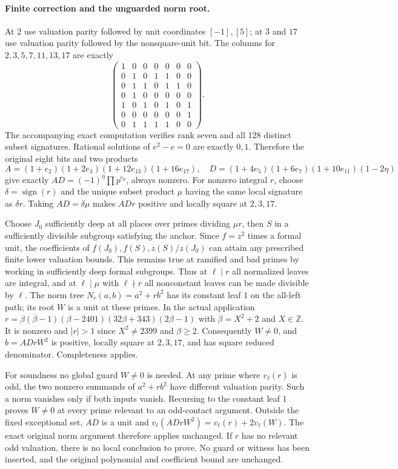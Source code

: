 \paragraph{Finite correction and the unguarded norm root.}
At $2$ use valuation parity followed by unit coordinates $[-1],[5]$;
at $3$ and $17$ use valuation parity followed by the nonsquare-unit bit.
The columns for $2,3,5,7,11,13,17$ are exactly
\[
\begin{pmatrix}
1&0&0&0&0&0&0\\0&1&0&1&1&0&0\\0&1&1&0&1&1&0\\
0&1&0&0&0&0&0\\1&0&1&0&1&0&1\\0&0&0&0&0&0&1\\
0&1&1&1&1&0&0
\end{pmatrix}.
\]
The accompanying exact computation verifies rank seven and all 128
distinct subset signatures. Rational solutions of $e^2-e=0$ are
exactly $0,1$. Therefore the original eight bits and two products
\[
 A=(1+e_2)(1+2e_3)(1+12e_{13})(1+16e_{17}),\quad
 D=(1+4e_5)(1+6e_7)(1+10e_{11})(1-2\eta)
\]
give exactly $AD=(-1)^\eta\prod p^{e_p}$, always nonzero.
For nonzero integral $r$, choose $\delta=\operatorname{sign}(r)$
and the unique subset product $\mu$ having the same local signature
as $\delta r$. Taking $AD=\delta\mu$ makes $ADr$ positive and
locally square at $2,3,17$.

Choose $J_0$ sufficiently deep at all places over primes dividing
$\mu r$, then $S$ in a sufficiently divisible subgroup satisfying
the anchor. Since $f=z^2$ times a formal unit, the coefficients of
$f(J_0),f(S),z(S)/z(J_0)$ can attain any prescribed finite lower
valuation bounds. This remains true at ramified and bad primes by
working in sufficiently deep formal subgroups. Thus at $\ell\mid r$
all normalized leaves are integral, and at $\ell\mid\mu$ with
$\ell\nmid r$ all nonconstant leaves can be made divisible by $\ell$.
The norm tree $N_r(a,b)=a^2+rb^2$ has its constant leaf $1$ on
the all-left path; its root $W$ is a unit at these primes.
In the actual application $r=\beta(\beta-1)(\beta-2401)
(32\beta+343)(2\beta-1)$ with $\beta=X^2+2$ and $X\in\mathbb Z$.
It is nonzero and $|r|>1$ since $X^2\ne2399$ and $\beta\ge2$.
Consequently $W\ne0$, and $b=ADrW^2$ is positive, locally square
at $2,3,17$, and has square reduced denominator. Completeness applies.

For soundness no global guard $W\ne0$ is needed. At any prime where
$v_\ell(r)$ is odd, the two nonzero summands of $a^2+rb^2$ have
different valuation parity. Such a norm vanishes only if both inputs
vanish. Recursing to the constant leaf $1$ proves $W\ne0$ at every
prime relevant to an odd-contact argument. Outside the fixed
exceptional set, $AD$ is a unit and
$v_\ell(ADrW^2)=v_\ell(r)+2v_\ell(W)$.
The exact original norm argument therefore applies unchanged. If
$r$ has no relevant odd valuation, there is no local conclusion to
prove. No guard or witness has been inserted, and the original
polynomial and coefficient bound are unchanged.

